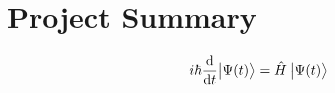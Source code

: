 \section{Project Summary}

\lipsum[66]

\begin{equation}
  i \hbar \frac{\dd}{\mathrm{d} t}\ket[\big]{\Psi(t)} = \hat{H}\: \ket[\big]{\Psi(t)} 
\end{equation}
